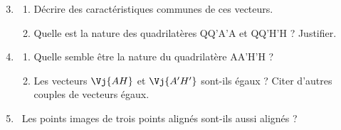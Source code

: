 \documentclass[a4paper,11pt,french]{report}
\begin{document}
\begin{ActiviteBox}
\begin{enumerate}
\setcounter{enumi}{2}
\item
\begin{enumerate}
\item Décrire des caractéristiques communes de ces vecteurs.
\item Quelle est la nature des quadrilatères QQ'A'A et QQ'H'H ? Justifier.
\end{enumerate}
\item
\begin{enumerate}
\item Quelle semble être la nature du quadrilatère AA'H'H ?
\item Les vecteurs $\Vj{AH}$ et $\Vj{A'H'}$ sont-ils égaux ? Citer d'autres couples de vecteurs égaux.
\end{enumerate}
\item \PALP\ Les points images de trois points alignés sont-ils aussi alignés ?
\end{enumerate}

\end{ActiviteBox}

\bigskip
\end{document}
